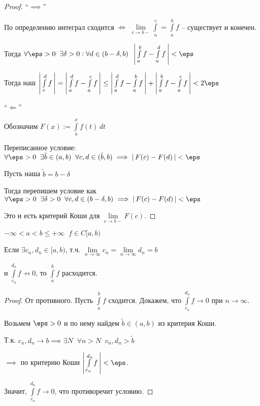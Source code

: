 \begin{proof}\slashns
	
	``$\implies$''
	
	По определению интеграл сходится $\iff$ $\lim\limits_{c \to b-} \int\limits_a^c = \int\limits_a^b f$ -- существует и конечен.
	
	Тогда $\forall \eps > 0 \;\; \exists \delta > 0 : \forall d \in(b - \delta, b) \;\; \abs{\int\limits_a^b f - \int\limits_a^d f} < \eps$
	
	Тогда наш $ \abs{\int\limits_c^d f} = \abs{\int\limits_a^d f - \int\limits_a^c f} \le \abs{\int\limits_a^d f - \int\limits_a^b f} + \abs{\int\limits_a^b f - \int\limits_a^c f} < 2\eps$
	
	``$\Longleftarrow$''
	
	Обозначим $F(x) := \int\limits_a^x f(t) \, dt$
	
	Переписанное условие: $\forall \eps > 0 \;\;\exists \tilde{b} \in (a,b)\;\; \forall c, d \in (\tilde{b}, b) \implies \abs{F(c) - F(d)} < \eps$
	
	Пусть наша $\tilde{b} = b - \delta$
	
	Тогда перепишем условие как $\forall \eps > 0 \;\;\exists \delta > 0 \;\;\forall c, d \in (b- \delta, b) \implies \abs{F(c) - F(d)} < \eps$
	
	Это и есть критерий Коши для $\lim\limits_{c \to b-} F(c)$.
\end{proof}

\begin{consequence}\slashns
	
	$-\infty < a < b \le +\infty \;\; f \in C[a,b)$
	
	Если $\exists c_n, d_n \in[a,b)$, т.ч. $\lim\limits_{n \to \infty} c_n = \lim\limits_{n \to \infty} d_n = b$
	
	и $\int\limits_{c_n}^{d_n} f \not\to 0$, то $\int\limits_a^b f$ расходится.
	
\end{consequence}

\begin{proof}\slashns
	
	От противного. Пусть $\int\limits_a^b f$ сходится. Докажем, что $\int\limits_{c_n}^{d_n} f \to 0$ при $n \to \infty$.
	
	Возьмем $\eps > 0$ и по нему найдем $\tilde{b} \in (a,b)$ из критерия Коши.
	
	Т.к. $c_n, d_n \to b \implies \exists N \;\; \forall n > N \;\; c_n, d_n > \tilde{b}$
	
	$\implies$ по критерию Коши $\abs{\int\limits_{c_n}^{d_n} f} < \eps$.
	
	Значит, $\int\limits_{c_n}^{d_n} f \to 0$, что противоречит условию.
\end{proof}


